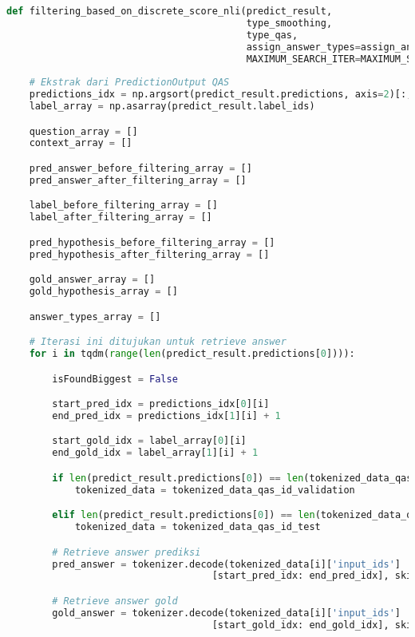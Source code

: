 \begin{lstlisting}[language=Python, caption= Melakukan \emph{filtering} jawaban]
def filtering_based_on_discrete_score_nli(predict_result, 
                                          type_smoothing, 
                                          type_qas, 
                                          assign_answer_types=assign_answer_types, 
                                          MAXIMUM_SEARCH_ITER=MAXIMUM_SEARCH_ITER):
    
    # Ekstrak dari PredictionOutput QAS
    predictions_idx = np.argsort(predict_result.predictions, axis=2)[:, :, 1 * -1]
    label_array = np.asarray(predict_result.label_ids)

    question_array = []
    context_array = []

    pred_answer_before_filtering_array = []
    pred_answer_after_filtering_array = []

    label_before_filtering_array = []
    label_after_filtering_array = []

    pred_hypothesis_before_filtering_array = []
    pred_hypothesis_after_filtering_array = []

    gold_answer_array = []
    gold_hypothesis_array = []

    answer_types_array = []

    # Iterasi ini ditujukan untuk retrieve answer
    for i in tqdm(range(len(predict_result.predictions[0]))):

        isFoundBiggest = False

        start_pred_idx = predictions_idx[0][i]
        end_pred_idx = predictions_idx[1][i] + 1

        start_gold_idx = label_array[0][i]
        end_gold_idx = label_array[1][i] + 1

        if len(predict_result.predictions[0]) == len(tokenized_data_qas_id_validation):
            tokenized_data = tokenized_data_qas_id_validation

        elif len(predict_result.predictions[0]) == len(tokenized_data_qas_id_test):
            tokenized_data = tokenized_data_qas_id_test

        # Retrieve answer prediksi
        pred_answer = tokenizer.decode(tokenized_data[i]['input_ids']
                                    [start_pred_idx: end_pred_idx], skip_special_tokens=True)

        # Retrieve answer gold
        gold_answer = tokenizer.decode(tokenized_data[i]['input_ids']
                                    [start_gold_idx: end_gold_idx], skip_special_tokens=True)


\end{lstlisting}
